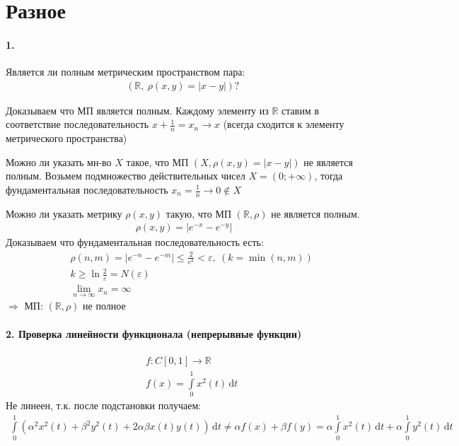\documentclass{article}[12pt]
\renewcommand{\d}{\,\mathrm{d}}
\newcommand{\R}{\mathbb{R}}
\begin{document}
\section{Разное}
\paragraph{1.}
Является ли полным метрическим пространством пара:
\begin{eqnarray*}
    \Bigg(\ \R,\ \rho(x,y)=|x-y|\ \Bigg)\ ?
\end{eqnarray*}
\par Доказываем что МП является полным. Каждому элементу из $\R$ ставим в соответствие последовательность
$x+\frac{1}{n}=x_{n}\to x$ (всегда сходится к элементу метрического пространства)
\par Можно ли указать мн-во $X$ такое, что МП $(X,\rho(x,y)=|x-y|)$ не является
полным. Возьмем подмножество действительных чисел $X=(0;+\infty)$, тогда фундаментальная
последовательность $x_{n}=\frac{1}{n}\to 0\notin X$
\par Можно ли указать метрику $\rho(x,y)$ такую, что МП $(\R,\rho)$ не является полным.
\begin{eqnarray*}
    \rho(x,y)=|e^{-x}-e^{-y}|
\end{eqnarray*}
Доказываем что фундаментальная последовательность есть:
\begin{eqnarray*}
    &&\rho(n,m)=|e^{-n}-e^{-m}|\leqslant \frac{2}{e^{k}}< \varepsilon,\ (k=\min(n,m))\\
    &&k\geqslant \ln{\frac{2}{\varepsilon}}=N(\varepsilon)\\
    &&\lim\limits_{n\rightarrow \infty}x_{n}=\infty
\end{eqnarray*}
$\Rightarrow $ МП: $(\R,\rho)$ не полное

\paragraph{2. Проверка линейности функционала (непрерывные функции)}
\begin{eqnarray*}
    &&f:C[0,1]\to \R\\
    &&f(x)=\int\limits_{0}^{1}x^{2}(t)\d{t}
\end{eqnarray*}
Не линеен, т.к. после подстановки получаем:
\begin{eqnarray*}
    \int\limits_{0}^{1}(\alpha^{2}x^{2}(t)+\beta^{2}y^{2}(t)+2\alpha\beta
    x(t)y(t))\d{t}
    \neq \alpha f(x)+\beta f(y)
    =\alpha\int\limits_{0}^{1}x^{2}(t)\d{t}
    +\alpha\int\limits_{0}^{1}y^{2}(t)\d{t}
\end{eqnarray*}
\end{document}

